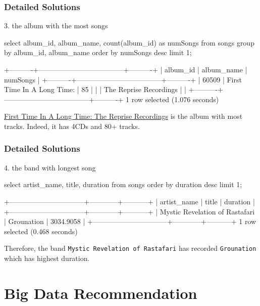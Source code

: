 \documentclass{beamer}
\begin{document}
\begin{frame}[fragile]

\frametitle{Detailed Solutions}
3. the album with the most songs

\begin{mycodesql}
select album_id, album_name, count(album_id) as numSongs
from songs
group by album_id, album_name
order by numSongs desc
limit 1;

+----------+------------------------------------+----------+
| album_id |              album_name            | numSongs |
+----------+------------------------------------+----------+
| 60509    | First Time In A Long Time:         | 85       | 
|          | The Reprise Recordings             |          |
+----------+------------------------------------+----------+
1 row selected (1.076 seconds) 
\end{mycodesql}

\href{https://www.discogs.com/release/4483625-Fanny-First-Time-In-A-Long-Time-The-Reprise-Recordings}{First Time In A Long Time: The Reprise Recordings} is the album with most tracks. Indeed, it has 4CDs and 80+ tracks.
\end{frame}

\begin{frame}[fragile]
    \frametitle{Detailed Solutions}

    4. the band with longest song

\begin{mycodesql}
select artist_name, title, duration from songs
order by duration desc limit 1; 

+--------------------------------+------------+-----------+
|          artist_name           |   title    | duration  |
+--------------------------------+------------+-----------+ 
| Mystic Revelation of Rastafari | Grounation | 3034.9058 | 
+--------------------------------+------------+-----------+  
1 row selected (0.468 seconds) 
\end{mycodesql}

Therefore, the band \verb|Mystic Revelation of Rastafari| has recorded \verb|Grounation| which has highest duration.

\end{frame}

\section{Big Data Recommendation}
\end{document}
